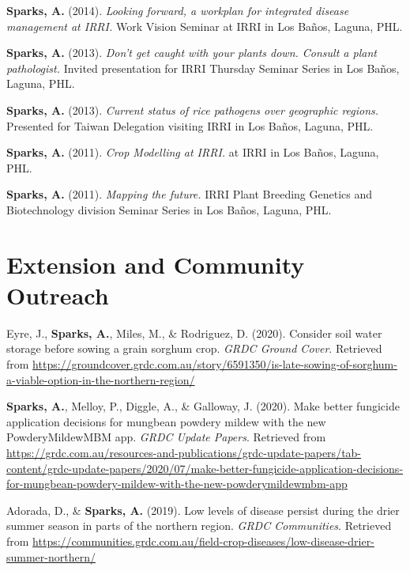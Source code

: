 \documentclass[11pt, a4paper]{awesome-cv}
\begin{document}
\textbf{Sparks, A.} (2014). \emph{Looking forward, a workplan for integrated disease management at IRRI.} Work Vision Seminar at IRRI in Los Baños, Laguna, PHL.

\textbf{Sparks, A.} (2013). \emph{Don't get caught with your plants down. Consult a plant pathologist.} Invited presentation for IRRI Thursday Seminar Series in Los Baños, Laguna, PHL.

\textbf{Sparks, A.} (2013). \emph{Current status of rice pathogens over geographic regions.} Presented for Taiwan Delegation visiting IRRI in Los Baños, Laguna, PHL.

\textbf{Sparks, A.} (2011). \emph{Crop Modelling at IRRI.} at IRRI in Los Baños, Laguna, PHL.

\textbf{Sparks, A.} (2011). \emph{Mapping the future.} IRRI Plant Breeding Genetics and Biotechnology division Seminar Series in Los Baños, Laguna, PHL.

\endgroup

\hypertarget{extension-and-community-outreach}{%
\section{Extension and Community Outreach}\label{extension-and-community-outreach}}

\begingroup
\setlength{\parindent}{-0.5in}
\setlength{\leftskip}{0.5in}

\hypertarget{refs_extension}{}
\leavevmode\hypertarget{ref-Eyre2020}{}%
Eyre, J., \textbf{Sparks, A.}, Miles, M., \& Rodriguez, D. (2020). Consider soil water storage before sowing a grain sorghum crop. \emph{GRDC Ground Cover}. Retrieved from \url{https://groundcover.grdc.com.au/story/6591350/is-late-sowing-of-sorghum-a-viable-option-in-the-northern-region/}

\leavevmode\hypertarget{ref-Sparks2020}{}%
\textbf{Sparks, A.}, Melloy, P., Diggle, A., \& Galloway, J. (2020). Make better fungicide application decisions for mungbean powdery mildew with the new PowderyMildewMBM app. \emph{GRDC Update Papers}. Retrieved from \url{https://grdc.com.au/resources-and-publications/grdc-update-papers/tab-content/grdc-update-papers/2020/07/make-better-fungicide-application-decisions-for-mungbean-powdery-mildew-with-the-new-powderymildewmbm-app}

\leavevmode\hypertarget{ref-Adorada2019a}{}%
Adorada, D., \& \textbf{Sparks, A.} (2019). Low levels of disease persist during the drier summer season in parts of the northern region. \emph{GRDC Communities}. Retrieved from \url{https://communities.grdc.com.au/field-crop-diseases/low-disease-drier-summer-northern/}
\end{document}
